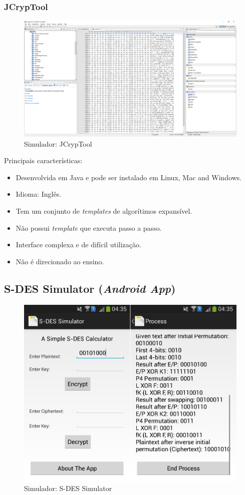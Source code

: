 \subsubsection{JCrypTool}

\begin{figure}[H]
    \centering
    \caption{Simulador: JCrypTool}
    \includegraphics[width=1\linewidth]{Simuladores/JCrypTool.png}
\end{figure}

Principais características:
\begin{itemize}
    \item Desenvolvida em Java e pode ser instalado em Linux, Mac and Windows.
    \item Idioma: Inglês.
    \item Tem um conjunto de \textit{templates} de algorítimos expansível.
    \item Não possui \textit{template} que executa passo a passo.
    \item Interface complexa e de difícil utilização.
    \item Não é direcionado ao ensino.
\end{itemize}

\subsection{S-DES Simulator (\textit{Android App})}

\begin{figure}[H]
    \centering
    \caption{Simulador: S-DES Simulator}
    \includegraphics[width=.75\linewidth]{Simuladores/SDESSimulatorApp.png}
\end{figure}

